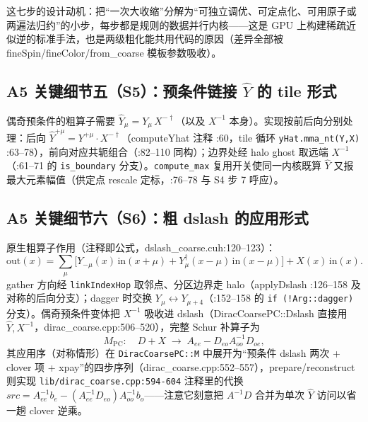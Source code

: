 \documentclass[UTF8]{ctexart}
\begin{document}
\textcolor{idea}{这七步的设计动机：把``一次大收缩''分解为``可独立调优、可定点化、可用原子或两遍法归约''的小步，每步都是规则的数据并行内核——这是 GPU 上构建稀疏近似逆的标准手法，也是两级粗化能共用代码的原因（差异全部被 fineSpin/fineColor/from\_coarse 模板参数吸收）。}

\subsection{A5 关键细节五（S5）：预条件链接 $\hat Y$ 的 tile 形式}

偶奇预条件的粗算子需要 $\hat Y_\mu=Y_\mu\,X^{-\dagger}$（以及 $X^{-1}$ 本身）。实现按前后向分别处理：后向 $\hat Y^{+\mu}=Y^{+\mu}\cdot X^{-\dagger}$（computeYhat 注释 :60，tile 循环 \texttt{yHat.mma\_nt(Y,X)} :63--78），前向对应共轭组合（:82--110 同构）；边界处经 halo ghost 取远端 $X^{-1}$（:61--71 的 \texttt{is\_boundary} 分支）。\texttt{compute\_max} 复用开关使同一内核既算 $\hat Y$ 又报最大元素幅值（供定点 rescale 定标，:76--78 与 S4 步 7 呼应）。

\subsection{A5 关键细节六（S6）：粗 dslash 的应用形式}

原生粗算子作用（注释即公式，dslash\_coarse.cuh:120--123）：
\begin{equation}
\mathrm{out}(x)=\sum_{\mu}\big[Y_{-\mu}(x)\,\mathrm{in}(x+\mu)+Y^{\dagger}_{\mu}(x-\mu)\,\mathrm{in}(x-\mu)\big]+X(x)\,\mathrm{in}(x).
\label{eq:coarsedslash}
\end{equation}
gather 方向经 \texttt{linkIndexHop} 取邻点、分区边界走 halo（applyDslash :126--158 及对称的后向分支）；dagger 时交换 $Y_{\mu}\leftrightarrow Y_{\mu+4}$（:152--158 的 \texttt{if (!Arg::dagger)} 分支）。偶奇预条件变体把 $X^{-1}$ 吸收进 dslash（DiracCoarsePC::Dslash 直接用 $\hat Y,X^{-1}$，dirac\_coarse.cpp:506--520），完整 Schur 补算子为
\begin{equation}
M_{\text{PC}}:\quad D\!+\!X \;\longrightarrow\; A_{ee}-D_{eo}A_{oo}^{-1}D_{oe},
\label{eq:schur}
\end{equation}
其应用序（对称情形）在 \texttt{DiracCoarsePC::M} 中展开为``预条件 dslash 两次 + clover 项 + xpay''的四步序列（dirac\_coarse.cpp:552--557），prepare/reconstruct 则实现 \textcolor{evidence}{\texttt{\nolinkurl{lib/dirac_coarse.cpp:594-604}}} 注释里的代换 $src=A_{ee}^{-1}b_e-(A_{ee}^{-1}D_{eo})A_{oo}^{-1}b_o$——注意它刻意把 $A^{-1}D$ 合并为单次 $\hat Y$ 访问以省一趟 clover 逆乘。
\end{document}
